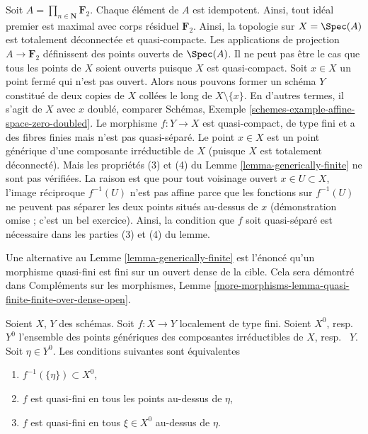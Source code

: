 \begin{example}
\label{example-counter-generically-finite}
Soit $A = \prod_{n \in \mathbf{N}} \mathbf{F}_2$. Chaque élément de $A$ est idempotent.
Ainsi, tout idéal premier est maximal avec corps résiduel $\mathbf{F}_2$.
Ainsi, la topologie sur $X = \Spec(A)$
est totalement déconnectée et quasi-compacte. Les applications
de projection $A \to \mathbf{F}_2$ définissent des points ouverts de $\Spec(A)$. Il
ne peut pas être le cas que tous les points de $X$ soient ouverts
puisque $X$ est quasi-compact. Soit $x \in X$ un point fermé
qui n'est pas ouvert. Alors nous pouvons former un schéma $Y$ constitué
de deux copies de $X$ collées le long de $X \setminus \{x\}$. En
d'autres termes, il s'agit de $X$
avec $x$ doublé, comparer Schémas, Exemple \ref{schemes-example-affine-space-zero-doubled}. Le
morphisme
$f : Y \to X$ est quasi-compact, de type fini et a des fibres finies mais n'est
pas quasi-séparé. Le point
$x \in X$ est un point générique d'une composante irréductible de $X$
(puisque $X$ est totalement déconnecté). Mais les propriétés (3)
et (4) du Lemme \ref{lemma-generically-finite} ne sont pas vérifiées. La raison est que pour tout
voisinage ouvert $x \in U \subset X$, l'image réciproque $f^{-1}(U)$ n'est pas affine
parce que les fonctions sur $f^{-1}(U)$ ne peuvent pas séparer les deux
points situés au-dessus de $x$ (démonstration omise ; c'est un
bel exercice). Ainsi, la condition que $f$ soit quasi-séparé est nécessaire
dans les parties (3) et (4) du lemme.
\end{example}

\begin{remark}
\label{remark-quasi-finite-finite-over-dense-open}
Une alternative
au Lemme \ref{lemma-generically-finite} est
l'énoncé qu'un morphisme quasi-fini est fini
sur un ouvert dense de la cible. Cela
sera démontré
dans Compléments sur les morphismes, Lemme \ref{more-morphisms-lemma-quasi-finite-finite-over-dense-open}.
\end{remark}

\begin{lemma}
\label{lemma-quasi-finiteness-over-generic-point}
Soient $X$, $Y$ des schémas. Soit $f : X \to Y$ localement de type fini. Soient $X^0$,
resp. \ $Y^0$ l'ensemble des points génériques des composantes irréductibles
de $X$, resp. \ $Y$. Soit $\eta \in Y^0$. Les conditions suivantes sont
équivalentes
\begin{enumerate}
\item $f^{-1}(\{\eta\}) \subset X^0$,
\item $f$ est quasi-fini en tous les points au-dessus de $\eta$,
\item $f$ est quasi-fini en tous $\xi \in X^0$ au-dessus de $\eta$.
\end{enumerate}
\end{lemma}

